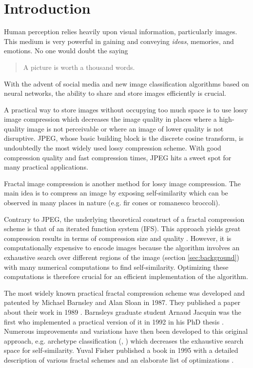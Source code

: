 \section{Introduction}\label{sec:intro}
Human perception relies heavily upon visual information, particularly images.
This medium is very powerful in gaining and conveying \textit{ideas}, memories,
and emotions. No one would doubt the saying
\begin{quote}
A picture is worth a thousand words.
\end{quote}
With the advent of social media and new image classification algorithms based on
neural networks, the ability to share and store images efficiently is crucial.

A practical way to store images without occupying too much space is to use lossy
image compression which decreases the image quality in places where a
high-quality image is not perceivable or where an image of lower quality is not
disruptive. JPEG, whose basic building block is the discrete cosine transform,
is undoubtedly the most widely used lossy compression scheme. With good
compression quality and fast compression times, JPEG hits a sweet spot for many
practical applications.

Fractal image compression is another method for lossy image compression. The
main idea is to compress an image by exposing self-similarity which can be
observed in many places in nature (e.g. fir cones or romanesco broccoli).

Contrary to JPEG, the underlying theoretical construct of a fractal compression
scheme is that of an iterated function system (IFS). This approach yields great
compression results in terms of compression size and quality \cite{fisher2012}.
However, it is computationally expensive to encode images because the algorithm
involves an exhaustive search over different regions of the image (section
\ref{sec:background}) with many numerical computations to find self-similarity.
Optimizing these computations is therefore crucial for an efficient
implementation of the algorithm.

 The most widely known practical fractal compression scheme
was developed and patented by Michael Barnsley and Alan Sloan in 1987. They
published a paper about their work in 1989 \cite{barnsley1989fractal}. Barnsleys
graduate student Arnaud Jacquin was the first who implemented a practical
version of it in 1992 in his PhD thesis \cite{jacquin1990fractal}. Numerous
improvements and variations have then been developed to this original approach,
e.g. archetype classification (\cite{jacobs1992image}, \cite{boss1991studies})
which decreases the exhaustive search space for self-similarity. Yuval Fisher
published a book in 1995 with a detailed description of various fractal schemes
and an elaborate list of optimizations \cite{fisher2012}.

